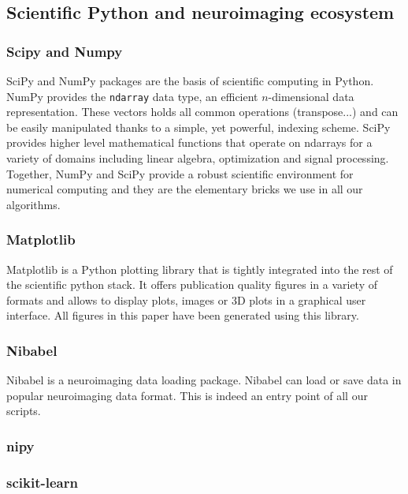 \documentclass{frontiersSCNS} %
\begin{document}
\subsection{Scientific Python and neuroimaging ecosystem}

\subsubsection{Scipy and Numpy}

SciPy and NumPy packages are the basis of scientific computing in Python.
NumPy provides the \verb!ndarray! data type, an efficient $n$-dimensional data
representation. These vectors holds all common operations (transpose...) and
can be easily manipulated thanks to a simple, yet powerful, indexing scheme.
SciPy provides higher level mathematical functions that operate on ndarrays for
a variety of domains including linear algebra, optimization and signal
processing. Together, NumPy and SciPy provide a robust scientific environment
for numerical computing and they are the elementary bricks we use in all our
algorithms.

\subsubsection{Matplotlib}

Matplotlib is a Python plotting library that is tightly integrated into the
rest of the scientific python stack. It offers publication quality figures in
a variety of formats and allows to display plots, images or 3D plots in a
graphical user interface. All figures in this paper have been generated using
this library.


\subsubsection{Nibabel}

Nibabel is a neuroimaging data loading package. Nibabel can load or save data in
popular neuroimaging data format. This is indeed an entry point of all
our scripts.

\subsubsection{nipy}


\subsubsection{scikit-learn}
\end{document}
